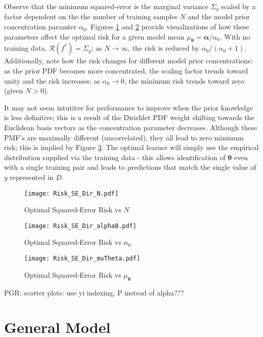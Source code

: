 \documentclass[12pt]{report}
\begin{document}
Observe that the minimum squared-error is the marginal variance $\Sigma_y$ scaled by a factor dependent on the the number of training samples $N$ and the model prior concentration paramter $\alpha_0$. Figures \ref{fig:Risk_SE_Dir_N} and \ref{fig:Risk_SE_Dir_alpha0} provide visualizations of how these parameters affect the optimal risk for a given model mean $\mu_{\bm{\theta}} = \bm{\alpha}/\alpha_0$. With no training data, $\mathcal{R}(f^*) = \Sigma_y$; as $N \longrightarrow \infty$, the risk is reduced by $\alpha_0 / (\alpha_0+1)$. Additionally, note how the risk changes for different model prior concentrations: as the prior PDF becomes more concentrated, the scaling factor trends toward unity and the risk increases; as $\alpha_0 \longrightarrow 0$, the minimum risk trends toward zero (given $N > 0$). 

It may not seem intutitve for performance to improve when the prior knowledge is less definitive; this is a result of the Dirichlet PDF weight shifting towards the Euclidean basis vectors as the concentration parameter decreases. Although these PMF's are maximally different (uncorrelated), they all lead to zero minimum risk; this is implied by Figure \ref{fig:Risk_SE_Dir_muTheta}. The optimal learner will simply use the empirical distribution supplied via the training data - this allows identification of $\bm{\theta}$ even with a single training pair and leads to predictions that match the single value of $y$ represented in $D$.




\begin{figure}
\centering
\texttt{[image: Risk\_SE\_Dir\_N.pdf]}
\caption{Optimal Squared-Error Risk vs $N$}
\label{fig:Risk_SE_Dir_N}
\end{figure}

\begin{figure}
\centering
\texttt{[image: Risk\_SE\_Dir\_alpha0.pdf]}
\caption{Optimal Squared-Error Risk vs $\alpha_0$}
\label{fig:Risk_SE_Dir_alpha0}
\end{figure}

\begin{figure}
\centering
\texttt{[image: Risk\_SE\_Dir\_muTheta.pdf]}
\caption{Optimal Squared-Error Risk vs $\mu_{\bm{\theta}}$}
\label{fig:Risk_SE_Dir_muTheta}
\end{figure}

PGR: scatter plots: use yi indexing, P instead of alpha???



\section{General Model}
\end{document}
